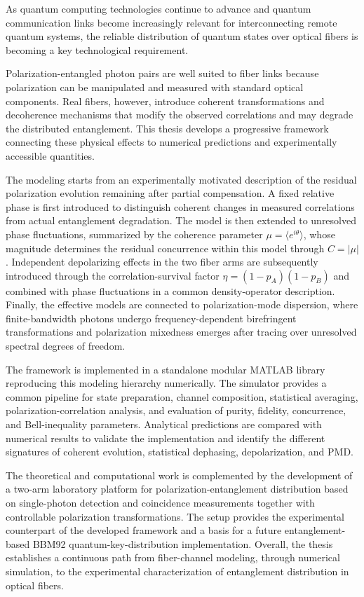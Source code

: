 As quantum computing technologies continue to advance and quantum communication links become increasingly relevant for interconnecting remote quantum systems, the reliable distribution of quantum states over optical fibers is becoming a key technological requirement.

Polarization-entangled photon pairs are well suited to fiber links because polarization can be manipulated and measured with standard optical components. Real fibers, however, introduce coherent transformations and decoherence mechanisms that modify the observed correlations and may degrade the distributed entanglement. This thesis develops a progressive framework connecting these physical effects to numerical predictions and experimentally accessible quantities.

The modeling starts from an experimentally motivated description of the residual polarization evolution remaining after partial compensation. A fixed relative phase is first introduced to distinguish coherent changes in measured correlations from actual entanglement degradation. The model is then extended to unresolved phase fluctuations, summarized by the coherence parameter \( \mu=\langle e^{i\theta}\rangle \), whose magnitude determines the residual concurrence within this model through \( C=|\mu| \). Independent depolarizing effects in the two fiber arms are subsequently introduced through the correlation-survival factor \( \eta=(1-p_A)(1-p_B) \) and combined with phase fluctuations in a common density-operator description. Finally, the effective models are connected to polarization-mode dispersion, where finite-bandwidth photons undergo frequency-dependent birefringent transformations and polarization mixedness emerges after tracing over unresolved spectral degrees of freedom.

The framework is implemented in a standalone modular MATLAB library reproducing this modeling hierarchy numerically. The simulator provides a common pipeline for state preparation, channel composition, statistical averaging, polarization-correlation analysis, and evaluation of purity, fidelity, concurrence, and Bell-inequality parameters. Analytical predictions are compared with numerical results to validate the implementation and identify the different signatures of coherent evolution, statistical dephasing, depolarization, and PMD.

The theoretical and computational work is complemented by the development of a two-arm laboratory platform for polarization-entanglement distribution based on single-photon detection and coincidence measurements together with controllable polarization transformations. The setup provides the experimental counterpart of the developed framework and a basis for a future entanglement-based BBM92 quantum-key-distribution implementation. Overall, the thesis establishes a continuous path from fiber-channel modeling, through numerical simulation, to the experimental characterization of entanglement distribution in optical fibers.
